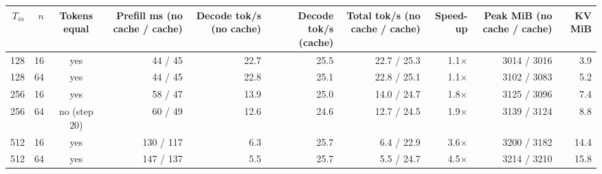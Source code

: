 \begin{tabular}{rrcrrrrrrr}\toprule
$T_{in}$ & $n$ & Tokens equal & Prefill ms (no cache / cache) & Decode tok/s (no cache) & Decode tok/s (cache) & Total tok/s (no cache / cache) & Speed-up & Peak MiB (no cache / cache) & KV MiB \\ \midrule
128 & 16 & yes & 44 / 45 & 22.7 & 25.5 & 22.7 / 25.3 & 1.1$\times$ & 3014 / 3016 & 3.9 \\
128 & 64 & yes & 44 / 45 & 22.8 & 25.1 & 22.8 / 25.1 & 1.1$\times$ & 3102 / 3083 & 5.2 \\
256 & 16 & yes & 58 / 47 & 13.9 & 25.0 & 14.0 / 24.7 & 1.8$\times$ & 3125 / 3096 & 7.4 \\
256 & 64 & no (step 20) & 60 / 49 & 12.6 & 24.6 & 12.7 / 24.5 & 1.9$\times$ & 3139 / 3124 & 8.8 \\
512 & 16 & yes & 130 / 117 & 6.3 & 25.7 & 6.4 / 22.9 & 3.6$\times$ & 3200 / 3182 & 14.4 \\
512 & 64 & yes & 147 / 137 & 5.5 & 25.7 & 5.5 / 24.7 & 4.5$\times$ & 3214 / 3210 & 15.8 \\
\bottomrule\end{tabular}
